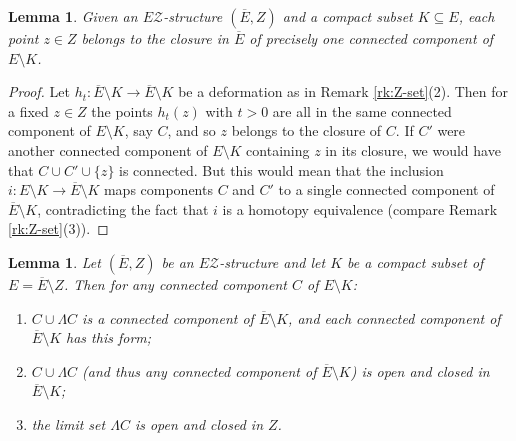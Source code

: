 \documentclass[12pt, a4paper]{article}
\newcommand{\8}{\infty}
\theoremstyle{break}
\newtheorem{lm}[thm]{Lemma}
\theoremstyle{defbreak}
\newcommand{\ol}[1]{\overline{#1}}
\begin{document}
\begin{lm}\label{one-component}
Given an $E\mathcal{Z}$-structure $(\ol E,Z)$ and a compact subset 
$K\subseteq E$, each point $z\in Z$
belongs to the closure in $\ol E$ of precisely one connected component
of $E\setminus K$.
\end{lm}

\begin{proof}
Let $h_t:\ol E\setminus K\to\ol E\setminus K$ be a deformation as in
Remark \ref{rk:Z-set}(2). Then for a fixed $z\in Z$ the points $h_t(z)$ with $t>0$
are all in the same connected component of $E\setminus K$, say $C$,
and so $z$ belongs to the closure of $C$. If $C'$ were another connected
component of $E\setminus K$ containing $z$ in its closure, 
we would have that $C\cup C'\cup\{ z \}$ is connected. 
But this would mean that the inclusion $i:E\setminus K\to\ol E\setminus K$
maps components $C$ and $C'$ to a single connected component
of $\ol E\setminus K$, contradicting the fact that $i$ is a homotopy
equivalence (compare Remark \ref{rk:Z-set}(3)). 
\end{proof}

\begin{lm}\label{form-of-component}
Let $(\ol E,Z)$ be an $E\mathcal{Z}$-structure and let $K$ be a compact
subset of $E=\ol E\setminus Z$. Then for any connected component $C$
of $E\setminus K$:
\begin{enumerate}
\item
$C\cup\Lambda C$ is a connected component of $\ol E\setminus K$,
and each connected component of $\ol E\setminus K$ has this form;
\item
$C\cup\Lambda C$ (and thus any connected component of 
$\ol E\setminus K$) is open and closed in $\ol E\setminus K$;
\item
the limit set $\Lambda C$ is open and closed in $Z$.
\end{enumerate}
\end{lm}
\end{document}
